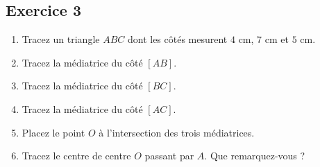 \documentclass[12 pt]{extarticle}
\theoremstyle{plain}
\begin{document}
 
 \subsection*{Exercice 3}
 
 \begin{enumerate}
 \item Tracez un triangle $ABC$ dont les côtés mesurent $4$ cm, $7$ cm et $5$ cm. 
 \item Tracez la médiatrice du côté $[AB]$. 
 \item Tracez la médiatrice du côté $[BC]$. 
 \item Tracez la médiatrice du côté $[AC]$. 
 \item Placez le point $O$ à l'intersection des trois médiatrices. 
 \item Tracez le centre de centre $O$ passant par $A$. Que remarquez-vous ? \end{enumerate}
 




 
 	
\end{document}
